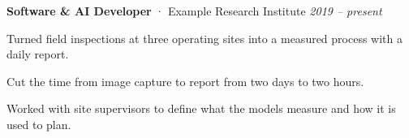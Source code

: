 \item \textbf{Software \& AI Developer} · Example Research Institute \hfill \textit{2019 -- present}
\begin{cvbullets}
  \item Turned field inspections at three operating sites into a measured process with a daily report.
  \item Cut the time from image capture to report from two days to two hours.
  \item Worked with site supervisors to define what the models measure and how it is used to plan.
\end{cvbullets}
